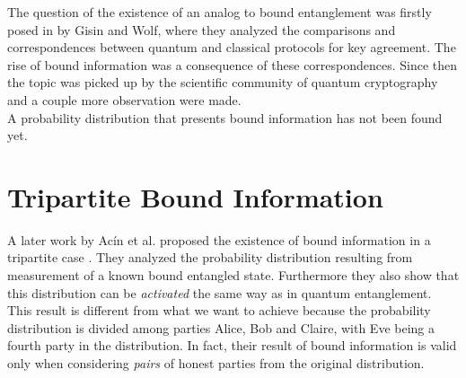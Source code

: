 The question of the existence of an analog to bound entanglement was firstly posed in \cite{GisWolf00} by Gisin and Wolf, where they analyzed the comparisons and correspondences between quantum and classical protocols for key agreement. 
The rise of bound information was a consequence of these correspondences.
Since then the topic was picked up by the scientific community of quantum cryptography and a couple more observation were made.\\
A probability distribution that presents bound information has not been found yet.

\section{Tripartite Bound Information}
    A later work by Ac\'in et al. proposed the existence of bound information in a tripartite case \cite{ACM04}. 
    They analyzed the probability distribution resulting from measurement of a known bound entangled state. 
    Furthermore they also show that this distribution can be \textit{activated} the same way as in quantum entanglement.\\
    This result is different from what we want to achieve because the probability distribution is divided among parties Alice, Bob and Claire, with Eve being a fourth party in the distribution. 
    In fact, their result of bound information is valid only when considering \emph{pairs} of honest parties from the original distribution.
